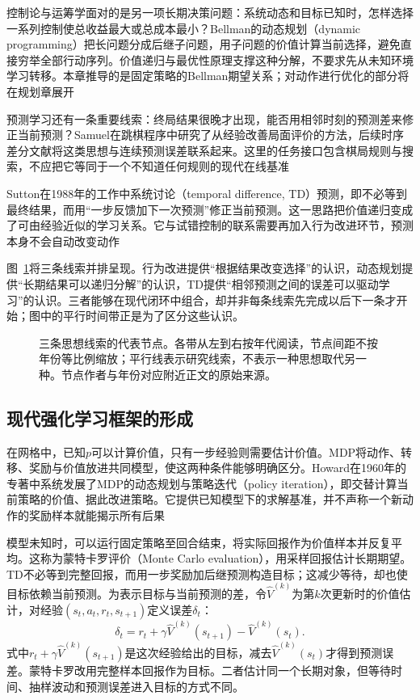 控制论与运筹学面对的是另一项长期决策问题：系统动态和目标已知时，怎样选择一系列控制使总收益最大或总成本最小？Bellman的动态规划（dynamic programming）把长问题分成后继子问题，用子问题的价值计算当前选择，避免直接穷举全部行动序列。价值递归与最优性原理支撑这种分解，不要求先从未知环境学习转移。本章推导的是固定策略的Bellman期望关系；对动作进行优化的部分将在规划章展开

预测学习还有一条重要线索：终局结果很晚才出现，能否用相邻时刻的预测差来修正当前预测？Samuel在跳棋程序中研究了从经验改善局面评价的方法，后续时序差分文献将这类思想与连续预测误差联系起来。这里的任务接口包含棋局规则与搜索，不应把它等同于一个不知道任何规则的现代在线基准

Sutton在1988年的工作中系统讨论（temporal difference, TD）预测，即不必等到最终结果，而用“一步反馈加下一次预测”修正当前预测。这一思路把价值递归变成了可由经验近似的学习关系。它与试错控制的联系需要再加入行为改进环节，预测本身不会自动改变动作

图~\ref{fig:rl-overview-history}将三条线索并排呈现。行为改进提供“根据结果改变选择”的认识，动态规划提供“长期结果可以递归分解”的认识，TD提供“相邻预测之间的误差可以驱动学习”的认识。三者能够在现代闭环中组合，却并非每条线索先完成以后下一条才开始；图中的平行时间带正是为了区分这些认识。

\begin{figure}[htbp]
  \centering
  
  \caption{三条思想线索的代表节点。各带从左到右按年代阅读，节点间距不按年份等比例缩放；平行线表示研究线索，不表示一种思想取代另一种。节点作者与年份对应附近正文的原始来源。}
  \label{fig:rl-overview-history}
\end{figure}

\subsection{现代强化学习框架的形成}
\label{sec:rl-overview-modern}

在网格中，已知$p$可以计算价值，只有一步经验则需要估计价值。MDP将动作、转移、奖励与价值放进共同模型，使这两种条件能够明确区分。Howard在1960年的专著中系统发展了MDP的动态规划与策略迭代（policy iteration），即交替计算当前策略的价值、据此改进策略。它提供已知模型下的求解基准，并不声称一个新动作的奖励样本就能揭示所有后果

模型未知时，可以运行固定策略至回合结束，将实际回报作为价值样本并反复平均。这称为蒙特卡罗评价（Monte Carlo evaluation），用采样回报估计长期期望。TD不必等到完整回报，而用一步奖励加后继预测构造目标；这减少等待，却也使目标依赖当前预测。为表示目标与当前预测的差，令$\widehat V^{(k)}$为第$k$次更新时的价值估计，对经验$(s_t,a_t,r_t,s_{t+1})$定义误差$\delta_t$：
\[
  \delta_t=r_t+\gamma\widehat V^{(k)}(s_{t+1})
                    -\widehat V^{(k)}(s_t).
\]
式中$r_t+\gamma\widehat V^{(k)}(s_{t+1})$是这次经验给出的目标，减去$\widehat V^{(k)}(s_t)$才得到预测误差。蒙特卡罗改用完整样本回报作为目标。二者估计同一个长期对象，但等待时间、抽样波动和预测误差进入目标的方式不同。

